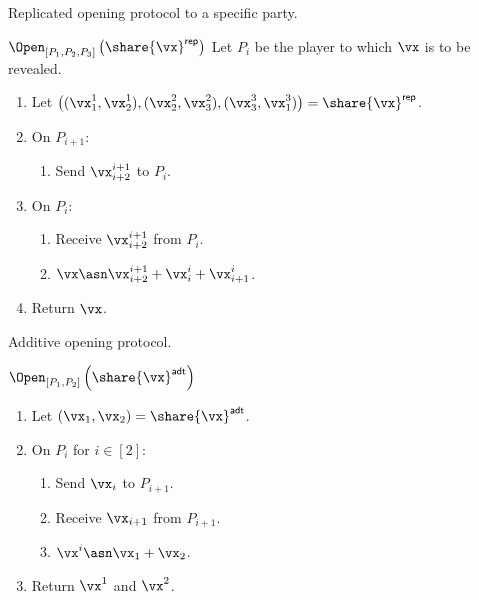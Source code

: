 Replicated opening protocol to a specific party.

\msubsubsection
{$\Open_{[P_1, P_2, P_3]} \left( \share{\vx}^{\mathsf{rep}} \right)$}
 \label{fig:replicated-open}
  Let $P_i$ be the player to which $\vx$ is to be revealed.

  \begin{enumerate}
  \item Let $\left( (\vx_1^1, \vx_2^1), (\vx_2^2, \vx_3^2), (\vx_3^3, \vx_1^3) \right) = \share{\vx}^{\mathsf{rep}}$.
  \item On $P_{i+1}$:
  \begin{enumerate}
    \item Send $\vx_{i+2}^{i+1}$ to $P_{i}$.
  \end{enumerate}
  \item On $P_i$:
  \begin{enumerate}
   \item Receive $\vx_{i+2}^{i+1}$ from $P_{i}$.
   \item $\vx \asn \vx_{i+2}^{i+1} + \vx_i^i + \vx_{i+1}^{i}$.
  \end{enumerate}
  \item Return $\vx$.
\end{enumerate}


Additive opening protocol.

\msubsubsection
{$\Open_{[P_1, P_2]} \left( \share{\vx}^{\mathsf{adt}} \right)$}
\label{fig:additive-open}
  \begin{enumerate}
  \item Let $(\vx_1, \vx_2) = \share{\vx}^{\mathsf{adt}}$.
  \item On $P_i$ for $i \in [2]$:
  \begin{enumerate}
    \item Send $\vx_i$ to $P_{i+1}$.
    \item Receive $\vx_{i+1}$ from $P_{i+1}$.
    \item $\vx^i \asn \vx_1 + \vx_2$.
  \end{enumerate}
  \item Return $\vx^1$ and $\vx^2$.
\end{enumerate}
